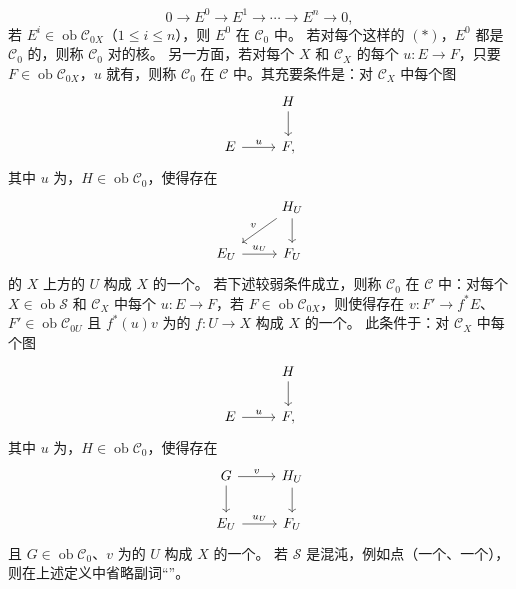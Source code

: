 \[0\longrightarrow E^0\longrightarrow E^1\longrightarrow\cdots\longrightarrow E^n\longrightarrow0,\tag{*}\]
若 $E^i\in\operatorname{ob}\mathscr C_{0X}$（$1\leq i\leq n$），则 $E^0$ 在 $\mathscr C_0$ 中。
若对每个这样的 $(*)$，$E^0$ 都是 $\mathscr C_0$ 的，则称 $\mathscr C_0$ 对的核。
另一方面，若对每个 $X$ 和 $\mathscr C_X$ 的每个 $u:E\to F$，只要 $F\in\operatorname{ob}\mathscr C_{0X}$，$u$ 就有，则称 $\mathscr C_0$ 在 $\mathscr C$ 中。其充要条件是：对 $\mathscr C_X$ 中每个图
\[\begin{tikzcd}&H\arrow[d]\\E\arrow[r,"u"]&F,\end{tikzcd}\]
其中 $u$ 为，$H\in\operatorname{ob}\mathscr C_0$，使得存在
\[\begin{tikzcd}&H_U\arrow[d]\arrow[dl,"v"']\\E_U\arrow[r,"u_U"]&F_U\end{tikzcd}\]
的 $X$ 上方的 $U$ 构成 $X$ 的一个。
若下述较弱条件成立，则称 $\mathscr C_0$ 在 $\mathscr C$ 中：对每个 $X\in\operatorname{ob}\mathscr S$ 和 $\mathscr C_X$ 中每个 $u:E\to F$，若 $F\in\operatorname{ob}\mathscr C_{0X}$，则使得存在 $v:F'\to f^*E$、$F'\in\operatorname{ob}\mathscr C_{0U}$ 且 $f^*(u)v$ 为的 $f:U\to X$ 构成 $X$ 的一个。
此条件于：对 $\mathscr C_X$ 中每个图
\[\begin{tikzcd}&H\arrow[d]\\E\arrow[r,"u"]&F,\end{tikzcd}\]
其中 $u$ 为，$H\in\operatorname{ob}\mathscr C_0$，使得存在
\[\begin{tikzcd}G\arrow[r,"v"]\arrow[d]&H_U\arrow[d]\\E_U\arrow[r,"u_U"]&F_U\end{tikzcd}\]
且 $G\in\operatorname{ob}\mathscr C_0$、$v$ 为的 $U$ 构成 $X$ 的一个。
若 $\mathscr S$ 是混沌，例如点（一个、一个），则在上述定义中省略副词“”。
